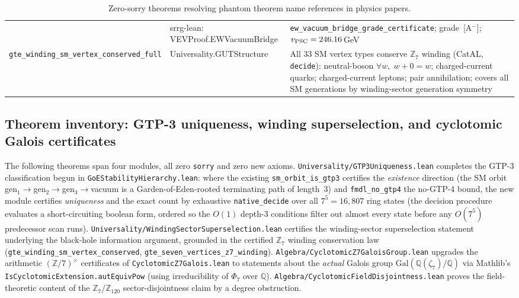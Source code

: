 \documentclass[11pt,a4paper]{article}
\theoremstyle{definition}
\begin{document}
\begin{table}[h]
\begin{tabular}{@{}p{5.2cm}p{4.4cm}p{4.4cm}@{}}
  & srrg-lean: VEVProof.\allowbreak EWVacuumBridge
  & \texttt{ew\_\allowbreak vacuum\_\allowbreak bridge\_\allowbreak grade\_\allowbreak certificate}; grade~[A$^-$]; $v_{\rm PSC}=246.16$\,GeV \\[1pt]
\texttt{gte\_\allowbreak winding\_\allowbreak sm\_\allowbreak vertex\_\allowbreak conserved\_\allowbreak full}
  & Universality.GUTStructure
  & All 33 SM vertex types conserve $\mathbb{Z}_7$ winding (CatAL, \texttt{decide}):
    neutral-boson $\forall w,\; w{+}0{=}w$; charged-current quarks; charged-current
    leptons; pair annihilation; covers all SM generations by winding-sector
    generation symmetry \\
\bottomrule
\end{tabular}
\caption{Zero-sorry theorems resolving phantom theorem name references in physics papers.}
\label{tab:new-theorem-inventory-audit}
\end{table}

\subsection{Theorem inventory: GTP-3 uniqueness, winding superselection, and
  cyclotomic Galois certificates}\label{subsec:new-theorem-inventory-gtp3-galois}

The following theorems span four modules, all zero \lstinline|sorry| and zero
new axioms.
\texttt{Universality/GTP3Uniqueness.lean} completes the GTP-3 classification
begun in \texttt{GoEStabilityHierarchy.lean}: where the existing
\lstinline|sm_orbit_is_gtp3| certifies the \emph{existence} direction (the SM
orbit gen$_1{\to}$gen$_2{\to}$gen$_3{\to}$vacuum is a Garden-of-Eden-rooted
terminating path of length~3) and \lstinline|fmdl_no_gtp4| the no-GTP-4 bound,
the new module certifies \emph{uniqueness} and the exact count by exhaustive
\lstinline|native_decide| over all $7^5 = 16{,}807$ ring states (the decision
procedure evaluates a short-circuiting boolean form, ordered so the $O(1)$
depth-3 conditions filter out almost every state before any $O(7^5)$
predecessor scan runs).
\texttt{Universality/WindingSectorSuperselection.lean} certifies the
winding-sector superselection statement underlying the black-hole information
argument, grounded in the certified $\mathbb{Z}_7$ winding conservation law
(\lstinline|gte_winding_sm_vertex_conserved|,
\lstinline|gte_seven_vertices_z7_winding|).
\texttt{Algebra/CyclotomicZ7GaloisGroup.lean} upgrades the arithmetic
$(\mathbb{Z}/7)^\times$ certificates of \texttt{CyclotomicZ7Galois.lean} to
statements about the \emph{actual} Galois group
$\mathrm{Gal}(\mathbb{Q}(\zeta_7)/\mathbb{Q})$ via Mathlib's
\lstinline|IsCyclotomicExtension.autEquivPow| (using irreducibility of
$\Phi_7$ over $\mathbb{Q}$).
\texttt{Algebra/CyclotomicFieldDisjointness.lean} proves the field-theoretic
content of the $\mathbb{Z}_7$/$\mathbb{Z}_{120}$ sector-disjointness claim by
a degree obstruction.
\end{document}
